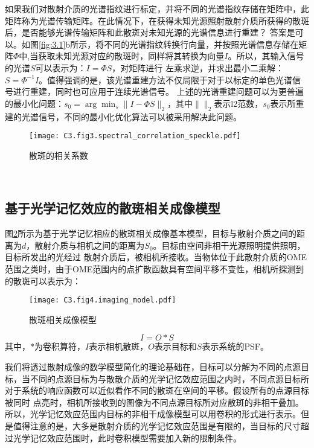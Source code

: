 如果我们对散射介质的光谱指纹进行标定，并将不同的光谱指纹存储在矩阵中，此矩阵称为光谱传输矩阵。在此情况下，在获得未知光源照射散射介质所获得的散斑后，是否能够光谱传输矩阵和此散斑对未知光源的光谱信息进行重建？
答案是可以。如图\ref{fig:3.1}b所示，将不同的光谱指纹转换行向量，并按照光谱信息存储在矩阵$\Phi$中,当获取未知光源对应的散斑时，同样将其转换为向量$I$。所以，其输入信号的光谱$S$可以表示为：$I={\Phi}S$，对矩阵进行
左乘求逆，并求出最小二乘解：$S={\Phi}^{-1}I$。值得强调的是，该光谱重建方法不仅局限于对于以标定的单色光谱信号进行重建，同时也可应用于连续光谱信号。
上述的光谱重建问题可以为更普遍的最小化问题：$s_{0}=\arg{\min_s \| I -{\Phi}S \|_2}$，其中$\|  \|_2$表示l2范数，$s_{0}$表示所重建的光谱信号，不同的最小化优化算法可以被采用解决此问题。
~\\
\begin{figure}[htp]
	\centering
	\texttt{[image: C3.fig3.spectral\_correlation\_speckle.pdf]}
	\caption{散斑的相关系数}
	\label{fig:3.3}
\end{figure}
~\\
\subsection{基于光学记忆效应的散斑相关成像模型}
图\ref{fig:3.4}所示为基于光学记忆相应的散斑相关成像基本模型，目标与散射介质之间的距离为$d$，散射介质与相机之间的距离为$S_{0}$。目标由空间非相干光源照明提供照明，目标所发出的光经过
散射介质后，被相机所接收。当物体位于此散射介质的OME范围之类时，由于OME范围内的点扩散函数具有空间平移不变性，相机所探测到的散斑可以表示为：
\begin{figure}[htp]
	\centering
	\texttt{[image: C3.fig4.imaging\_model.pdf]}
	\caption{散斑相关成像模型}
	\label{fig:3.4}
\end{figure}

\begin{equation}
    I = O*S
\label{eq:speckle_autocorrelation_imgaing}
\end{equation}其中，$*$为卷积算符，$I$表示相机散斑，$O$表示目标和$S$表示系统的PSF。

我们将透过散射成像的数学模型简化的理论基础在，目标可以分解为不同的点源目标，当不同的点源目标为与散散介质的光学记忆效应范围之内时，不同点源目标所对于系统的响应函数可以近似看作不同的散斑在空间的平移。假设所有的点源目标被同时
点亮时，相机所接收到的图像为不同点源目标所对应散斑的非相干叠加。所以，光学记忆效应范围内目标的非相干成像模型可以用卷积的形式进行表示。但是值得注意的是，大多是散射介质的光学记忆效应范围是有限的，当目标的尺寸超过光学记忆效应范围时，此时卷积模型需要加入新的限制条件。


